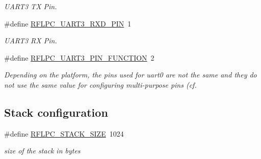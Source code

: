 \begin{DoxyCompactItemize}
\begin{DoxyCompactList}\small\item\em U\-A\-R\-T3 T\-X Pin. \end{DoxyCompactList}\item 
\hypertarget{group__config_ga447d22f8b082919d45f6b38c10c770a5}{\#define \hyperlink{group__config_ga447d22f8b082919d45f6b38c10c770a5}{R\-F\-L\-P\-C\-\_\-\-U\-A\-R\-T3\-\_\-\-R\-X\-D\-\_\-\-P\-I\-N}~1}\label{group__config_ga447d22f8b082919d45f6b38c10c770a5}

\begin{DoxyCompactList}\small\item\em U\-A\-R\-T3 R\-X Pin. \end{DoxyCompactList}\item 
\#define \hyperlink{group__config_ga96ec09a4733c111eb037839112f7ae3a}{R\-F\-L\-P\-C\-\_\-\-U\-A\-R\-T3\-\_\-\-P\-I\-N\-\_\-\-F\-U\-N\-C\-T\-I\-O\-N}~2
\begin{DoxyCompactList}\small\item\em Depending on the platform, the pins used for uart0 are not the same and they do not use the same value for configuring multi-\/purpose pins (cf. \end{DoxyCompactList}\end{DoxyCompactItemize}
\subsection*{Stack configuration}
\begin{DoxyCompactItemize}
\item 
\hypertarget{group__config_gabbee8373de1e5bcee5553825999d55c4}{\#define \hyperlink{group__config_gabbee8373de1e5bcee5553825999d55c4}{R\-F\-L\-P\-C\-\_\-\-S\-T\-A\-C\-K\-\_\-\-S\-I\-Z\-E}~1024}\label{group__config_gabbee8373de1e5bcee5553825999d55c4}

\begin{DoxyCompactList}\small\item\em size of the stack in bytes \end{DoxyCompactList}\end{DoxyCompactItemize}
